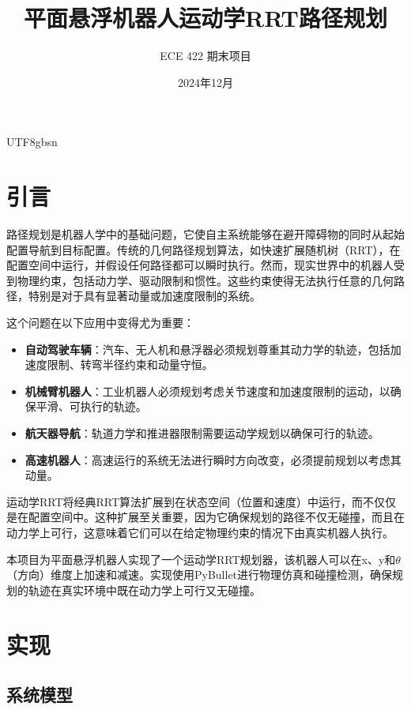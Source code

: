 \documentclass[11pt]{article}
\begin{document}
\begin{CJK}{UTF8}{gbsn}  %

\title{平面悬浮机器人运动学RRT路径规划}
\author{ECE 422 期末项目}
\date{2024年12月}

\maketitle

\section{引言}

路径规划是机器人学中的基础问题，它使自主系统能够在避开障碍物的同时从起始配置导航到目标配置。传统的几何路径规划算法，如快速扩展随机树（RRT），在配置空间中运行，并假设任何路径都可以瞬时执行。然而，现实世界中的机器人受到物理约束，包括动力学、驱动限制和惯性。这些约束使得无法执行任意的几何路径，特别是对于具有显著动量或加速度限制的系统。

这个问题在以下应用中变得尤为重要：
\begin{itemize}
    \item \textbf{自动驾驶车辆}：汽车、无人机和悬浮器必须规划尊重其动力学的轨迹，包括加速度限制、转弯半径约束和动量守恒。
    \item \textbf{机械臂机器人}：工业机器人必须规划考虑关节速度和加速度限制的运动，以确保平滑、可执行的轨迹。
    \item \textbf{航天器导航}：轨道力学和推进器限制需要运动学规划以确保可行的轨迹。
    \item \textbf{高速机器人}：高速运行的系统无法进行瞬时方向改变，必须提前规划以考虑其动量。
\end{itemize}

运动学RRT将经典RRT算法扩展到在状态空间（位置和速度）中运行，而不仅仅是在配置空间中。这种扩展至关重要，因为它确保规划的路径不仅无碰撞，而且在动力学上可行，这意味着它们可以在给定物理约束的情况下由真实机器人执行。

本项目为平面悬浮机器人实现了一个运动学RRT规划器，该机器人可以在x、y和$\theta$（方向）维度上加速和减速。实现使用PyBullet进行物理仿真和碰撞检测，确保规划的轨迹在真实环境中既在动力学上可行又无碰撞。

\section{实现}

\subsection{系统模型}


\end{CJK}
\end{document}
